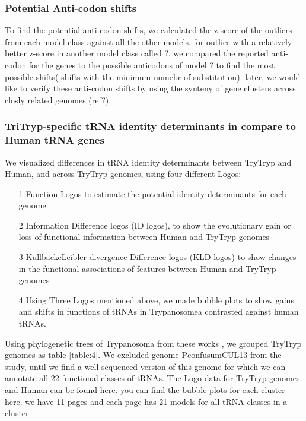 \documentclass[
10pt, %
a4paper, %
oneside, %
headinclude,footinclude, %
BCOR5mm, %
]{scrartcl}
\begin{document}
\subsubsection*{Potential Anti-codon shifts}
To find the potential anti-codon shifts, we calculated the z-score of the outliers from each model class against all the other models. for outlier with a relatively better z-score in another model class called ?, we compared the reported anti-codon for the genes to the possible anticodons of model ? to find the most possible shifts( shifts with the minimum numebr of substitution). later, we would like to verify these anti-codon shifts by using the synteny of gene clusters across closly related genomes (ref?).   

\subsubsection*{TriTryp-specific tRNA identity determinants in compare to Human tRNA genes}
We visualized differences in tRNA identity determinants between TryTryp and Human, and across TryTryp genomes, using four different Logos: 
\begin{enumerate}[noitemsep]

\item[1] Function Logos to estimate the potential identity determinants for each genome 
\item[2] Information Difference logos (ID logos), to show the evolutionary gain or loss of functional information between Human and TryTryp genomes 
\item[3] KullbackeLeibler divergence Difference logos (KLD logos) to show changes in the functional associations of features between Human and TryTryp genomes
\item[4] Using Three Logos mentioned above, we made bubble plots to show gains and shifts in functions of tRNAs in Trypanosomea contrasted against human tRNAs.

\end{enumerate}
Using phylogenetic trees of Trypanosoma from these works \cite{Souza:2018dg,Hughes:2003,Pothirat:2014,Kelly:2017}, we grouped TryTryp genomes as table \ref{table:4}. We excluded genome PconfusumCUL13 from the study, until we find a well sequenced version of this genome for which we can annotate all 22 functional classes of tRNAs. The Logo data for TryTryp genomes and Human can be found \href{https://github.com/fhadinezhadUC/Leishmania_2019/tree/master/Results/tsfmInput-output/output/Logos}{here}. you can find the bubble plots for each cluster \href{https://github.com/fhadinezhadUC/Leishmania_2019/tree/master/Results/tsfmInput-output/output/BubblePlots}{here}. we have 11 pages and each page has 21 models for all tRNA classes in a cluster. 
\end{document}
